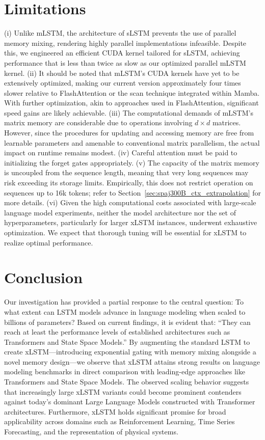 \section{Limitations}

(i) Unlike mLSTM, the architecture of sLSTM prevents the use of parallel memory mixing, rendering highly parallel implementations infeasible. Despite this, we engineered an efficient CUDA kernel tailored for sLSTM, achieving performance that is less than twice as slow as our optimized parallel mLSTM kernel. (ii) It should be noted that mLSTM's CUDA kernels have yet to be extensively optimized, making our current version approximately four times slower relative to FlashAttention or the scan technique integrated within Mamba. With further optimization, akin to approaches used in FlashAttention, significant speed gains are likely achievable. (iii) The computational demands of mLSTM’s matrix memory are considerable due to operations involving $d \times d$ matrices. However, since the procedures for updating and accessing memory are free from learnable parameters and amenable to conventional matrix parallelism, the actual impact on runtime remains modest. (iv) Careful attention must be paid to initializing the forget gates appropriately. (v) The capacity of the matrix memory is uncoupled from the sequence length, meaning that very long sequences may risk exceeding its storage limits. Empirically, this does not restrict operation on sequences up to 16k tokens; refer to Section~\ref{sec:spaj300B_ctx_extrapolation} for more details. (vi) Given the high computational costs associated with large-scale language model experiments, neither the model architecture nor the set of hyperparameters, particularly for larger xLSTM instances, underwent exhaustive optimization. We expect that thorough tuning will be essential for xLSTM to realize optimal performance.

\section{Conclusion}
Our investigation has provided a partial response to the central question: To what extent can LSTM models advance in language modeling when scaled to billions of parameters? Based on current findings, it is evident that: ``They can reach at least the performance levels of established architectures such as Transformers and State Space Models.'' By augmenting the standard LSTM to create xLSTM—introducing exponential gating with memory mixing alongside a novel memory design—we observe that xLSTM attains strong results on language modeling benchmarks in direct comparison with leading-edge approaches like Transformers and State Space Models. The observed scaling behavior suggests that increasingly large xLSTM variants could become prominent contenders against today’s dominant Large Language Models constructed with Transformer architectures. Furthermore, xLSTM holds significant promise for broad applicability across domains such as Reinforcement Learning, Time Series Forecasting, and the representation of physical systems.

